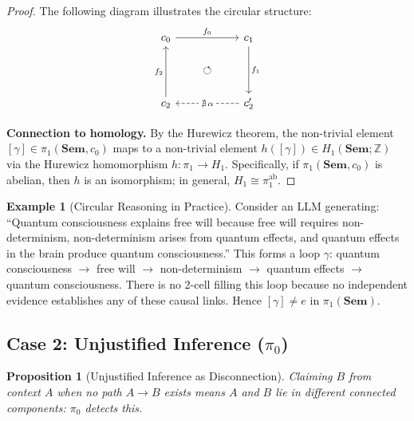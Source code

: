 \documentclass[11pt,a4paper]{article}
\theoremstyle{plain}
\newtheorem{proposition}[theorem]{Proposition}
\theoremstyle{definition}
\newtheorem{example}[theorem]{Example}
\theoremstyle{remark}
\newcommand{\Sem}{\mathbf{Sem}}
\newcommand{\Z}{\mathbb{Z}}
\begin{document}
\begin{proof}
The following diagram illustrates the circular structure:
\[
\begin{tikzcd}[column sep=2cm, row sep=1.5cm]
c_0 \arrow[r, "f_0"] \arrow[dr, phantom, "\circlearrowleft" description] & c_1 \arrow[d, "f_1"] \\
c_2 \arrow[u, "f_2"] & c_2' \arrow[l, dashed, "\nexists\,\alpha" description]
\end{tikzcd}
\]

\textbf{Connection to homology.} By the Hurewicz theorem, the non-trivial element $[\gamma] \in \pi_1(\Sem, c_0)$ maps to a non-trivial element $h([\gamma]) \in H_1(\Sem; \Z)$ via the Hurewicz homomorphism $h: \pi_1 \to H_1$. Specifically, if $\pi_1(\Sem, c_0)$ is abelian, then $h$ is an isomorphism; in general, $H_1 \cong \pi_1^{\mathrm{ab}}$.
\end{proof}

\begin{example}[Circular Reasoning in Practice]
\label{ex:circular}
Consider an LLM generating: ``Quantum consciousness explains free will because free will requires non-determinism, non-determinism arises from quantum effects, and quantum effects in the brain produce quantum consciousness.'' This forms a loop $\gamma$: quantum consciousness $\to$ free will $\to$ non-determinism $\to$ quantum effects $\to$ quantum consciousness. There is no 2-cell filling this loop because no independent evidence establishes any of these causal links. Hence $[\gamma] \neq e$ in $\pi_1(\Sem)$.
\end{example}

\subsection{Case 2: Unjustified Inference ($\pi_0$)}
\label{sec:case2}

\begin{proposition}[Unjustified Inference as Disconnection]
\label{prop:case2}
Claiming $B$ from context $A$ when no path $A \to B$ exists means $A$ and $B$ lie in different connected components: $\pi_0$ detects this.
\end{proposition}
\end{document}
